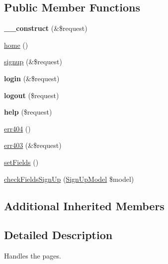 \subsection*{Public Member Functions}
\begin{DoxyCompactItemize}
\item 
\hypertarget{classBasePageController_a483998015a3518d49897d271de2e3c2d}{{\bfseries \+\_\+\+\_\+construct} (\&\$request)}\label{classBasePageController_a483998015a3518d49897d271de2e3c2d}

\item 
\hyperlink{classBasePageController_addd9e4039a708810ae0e60b94649db57}{home} ()
\item 
\hyperlink{classBasePageController_a26864cbbdf6ced03397b1960f160b0eb}{signup} (\&\$request)
\item 
\hypertarget{classBasePageController_afce6b70e28e6c5086231443dd8255688}{{\bfseries login} (\&\$request)}\label{classBasePageController_afce6b70e28e6c5086231443dd8255688}

\item 
\hypertarget{classBasePageController_afc95ea5d827f2d3231c4dccacd9cf319}{{\bfseries logout} (\$request)}\label{classBasePageController_afc95ea5d827f2d3231c4dccacd9cf319}

\item 
\hypertarget{classBasePageController_a62656a3ea9f23250caeebd4076fb84da}{{\bfseries help} (\$request)}\label{classBasePageController_a62656a3ea9f23250caeebd4076fb84da}

\item 
\hyperlink{classBasePageController_a34b8830d87502cefa09b06450f2b1fa7}{err404} ()
\item 
\hyperlink{classBasePageController_a984b448e25573a6de434b03e9f0c2795}{err403} (\&\$request)
\item 
\hyperlink{classBasePageController_a29d705f2a17c099861055f727c22af5e}{set\+Fields} ()
\item 
\hyperlink{classBasePageController_a9f88b7bdcd90ba8c4553f61c6eefee41}{check\+Fields\+Sign\+Up} (\hyperlink{classSignUpModel}{Sign\+Up\+Model} \$model)
\end{DoxyCompactItemize}
\subsection*{Additional Inherited Members}


\subsection{Detailed Description}
Handles the pages.


